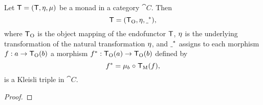 \begin{lemma}
  \label{lem:monad-to-triple}


  Let $\mathsf{T} = (\mathsf{T}, \eta, \mu)$ be a monad in a
  category $\cat{C}$. Then
  \begin{equation*}
    \mathsf{T} = (\mathsf{T}_{\operatorname{O}}, \eta, \underline{~}^*)
    \text{,}
  \end{equation*}
  where $\mathsf{T}_{\operatorname{O}}$ is the object mapping of the endofunctor
  $\mathsf{T}$, $\eta$ is the underlying transformation of the
  natural transformation $\eta$, and $\underline{~}^*$
  assigns to each morphism $f : a \to \mathsf{T}_{\operatorname{O}}(b)$ a morphism
  $f^*: \mathsf{T}_{\operatorname{O}}(a) \to \mathsf{T}_{\operatorname{O}}(b)$ defined by
  \begin{equation}
    \label{eq:monad-to-triple-extension}
    f^* = \mu_{b} \mathrel{\circ} \mathsf{T}_{\operatorname{M}}(f)
    \text{,}
  \end{equation}
  is a Kleisli triple in $\cat{C}$.

  \begin{proof}


\end{proof}
\end{lemma}
